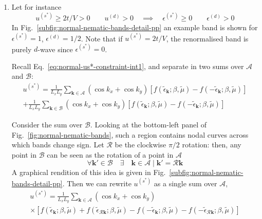 \begin{enumerate}
	\item Let for instance
	\[
	u^{(s^*)} \ge 2t/V > 0
	\qquad
	u^{(d)} > 0
	\quad\implies\quad
	\epsilon^{(s^*)} \ge 0
	\qquad
	\epsilon^{(d)} > 0
	\]
	In Fig.~\ref{subfig:normal-nematic-bands-detail-pp} an example band is shown for $\epsilon^{(s^*)}=1$, $\epsilon^{(d)}=1/2$. Note that if $u^{(s^*)}=2t/V$, the renormalised band is purely $d$-wave since $\epsilon^{(s^*)}=0$. 
	
	Recall Eq.~\eqref{eq:normal-us*-constraint-int1}, and separate in two sums over $\mathcal{A}$ and $\mathcal{B}$:
	\begin{multline*}
		u^{(s^*)} = \frac{1}{L_x L_y} \sum_{\mathbf{k}\in\mathcal{A}} (\cos k_x + \cos k_y) \left[
		f(\tilde{\epsilon}_\mathbf{k};\beta,\tilde{\mu}) - f(-\tilde{\epsilon}_\mathbf{k};\beta,\tilde{\mu})
		\right] \\
		+ \frac{1}{L_x L_y} \sum_{\mathbf{k}\in\mathcal{B}} (\cos k_x + \cos k_y) \left[
		f(\tilde{\epsilon}_\mathbf{k};\beta,\tilde{\mu}) - f(-\tilde{\epsilon}_\mathbf{k};\beta,\tilde{\mu})
		\right]
	\end{multline*}
	
	Consider the sum over $\mathcal{B}$. Looking at the bottom-left panel of Fig.~\ref{fig:normal-nematic-bands}, such a region contains nodal curves across which bands change sign.	
	Let $\mathcal{R}$ be the clockwise $\pi/2$ rotation: then, any point in $\mathcal{B}$ can be seen as the rotation of a point in $\mathcal{A}$
	\begin{equation}\label{eq:normal-B=RA}
		\forall \mathbf{k}' \in \mathcal{B} 
		\quad\exists\quad \mathbf{k} \in \mathcal{A} \mid \mathbf{k}' = \mathcal{R} \mathbf{k}
	\end{equation}
	A graphical rendition of this idea is given in Fig.~\ref{subfig:normal-nematic-bands-detail-pp}. Then we can rewrite $u^{(s^*)}$ as a single sum over $\mathcal{A}$,
	\begin{multline}
		u^{(s^*)} = \frac{1}{L_x L_y} \sum_{\mathbf{k}\in\mathcal{A}} (\cos k_x + \cos k_y) \\
		\times \left[
		f(\tilde{\epsilon}_\mathbf{k};\beta,\tilde{\mu}) + f(\tilde{\epsilon}_{\mathcal{R}\mathbf{k}};\beta,\tilde{\mu}) - f(-\tilde{\epsilon}_\mathbf{k};\beta,\tilde{\mu}) - f(-\tilde{\epsilon}_{\mathcal{R}\mathbf{k}};\beta,\tilde{\mu})
		\right]
		\label{eq:normal-us*-AR}
	\end{multline}
	

\end{enumerate}
